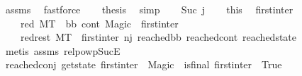 \begin{isabellebody}
\ assms\ \isamarkupfalse%
\ fastforce\isanewline
\ \ \isamarkupfalse%
\ {\isacharquery}{\kern0pt}thesis\ \isamarkupfalse%
\ simp\isanewline
{}\isamarkupfalse%
\isanewline
\ \ \isamarkupfalse%
\ {\isacharparenleft}{\kern0pt}Suc\ j{\isacharprime}{\kern0pt}{\isacharparenright}{\kern0pt}\isanewline
\ \ \isamarkupfalse%
\ this\ \isamarkupfalse%
\ first{\isacharunderscore}{\kern0pt}inter\ \ \isanewline
\ \ \ \ red{}{\isacharcolon}{\kern0pt}\ {\isachardoublequoteopen}M{\isacharcomma}{\kern0pt}{\isasymLambda}{\isacharcomma}{\kern0pt}{\isasymGamma}{\isacharcomma}{\kern0pt}{\isasymOmega}{\isacharcomma}{\kern0pt}T\ {\isasymturnstile}\ {\isasymlangle}{\isacharparenleft}{\kern0pt}bb{\isacharcomma}{\kern0pt}\ cont{\isacharcomma}{\kern0pt}\ Magic{\isacharparenright}{\kern0pt}{\isasymrangle}\ {\isasymlongrightarrow}\ first{\isacharunderscore}{\kern0pt}inter{\isachardoublequoteclose}\ \ \isanewline
\ \ \ \ red{\isacharunderscore}{\kern0pt}rest{\isacharcolon}{\kern0pt}\ {\isachardoublequoteopen}M{\isacharcomma}{\kern0pt}{\isasymLambda}{\isacharcomma}{\kern0pt}{\isasymGamma}{\isacharcomma}{\kern0pt}{\isasymOmega}{\isacharcomma}{\kern0pt}T\ {\isasymturnstile}\ first{\isacharunderscore}{\kern0pt}inter\ {\isacharminus}{\kern0pt}n{\isasymlongrightarrow}{\isacharcircum}{\kern0pt}j{\isacharprime}{\kern0pt}\ {\isacharparenleft}{\kern0pt}reached{\isacharunderscore}{\kern0pt}bb{\isacharcomma}{\kern0pt}\ reached{\isacharunderscore}{\kern0pt}cont{\isacharcomma}{\kern0pt}\ reached{\isacharunderscore}{\kern0pt}state{\isacharparenright}{\kern0pt}{\isachardoublequoteclose}\isanewline
\ \ \ \ \isamarkupfalse%
\ {\isacharparenleft}{\kern0pt}metis\ assms\ relpowp{\isacharunderscore}{\kern0pt}Suc{\isacharunderscore}{\kern0pt}E{}{\isacharparenright}{\kern0pt}\isanewline
\ \ \isamarkupfalse%
\ reached{\isacharunderscore}{\kern0pt}conj{\isacharcolon}{\kern0pt}\ {\isachardoublequoteopen}{\isacharparenleft}{\kern0pt}{\isacharparenleft}{\kern0pt}get{\isacharunderscore}{\kern0pt}state\ first{\isacharunderscore}{\kern0pt}inter{\isacharparenright}{\kern0pt}\ {\isacharequal}{\kern0pt}\ Magic{\isacharparenright}{\kern0pt}\ {\isasymand}\ {\isacharparenleft}{\kern0pt}{\isacharparenleft}{\kern0pt}is{\isacharunderscore}{\kern0pt}final\ first{\isacharunderscore}{\kern0pt}inter{\isacharparenright}{\kern0pt}\ {\isacharequal}{\kern0pt}\ True{\isacharparenright}{\kern0pt}{\isachardoublequoteclose}\ \isanewline

\end{isabellebody}
